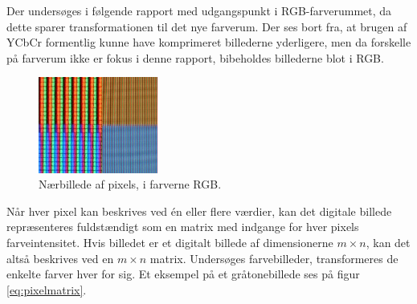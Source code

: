 Der undersøges i følgende rapport med udgangspunkt i RGB-farverummet, da dette sparer transformationen til det nye farverum. Der ses bort fra, at brugen af YCbCr formentlig kunne have komprimeret billederne yderligere, men da forskelle på farverum ikke er fokus i denne rapport, bibeholdes billederne blot i RGB.
\begin{figure}[htbp]
\centering
\includegraphics[width=0.35\textwidth]{Billeder/RGB_pixels.jpg}
\caption{Nærbillede af pixels, i farverne RGB.}
\label{fig:RGB_pixels}
\end{figure}

Når hver pixel kan beskrives ved én eller flere værdier, kan det digitale billede repræsenteres fuldstændigt som en matrix med indgange for hver pixels farveintensitet. Hvis billedet er et digitalt billede af dimensionerne $m \times n$, kan det altså beskrives ved en $m \times n$ matrix. Undersøges farvebilleder, transformeres de enkelte farver hver for sig. Et eksempel på et gråtonebillede ses på figur \vref{eq:pixelmatrix}.


